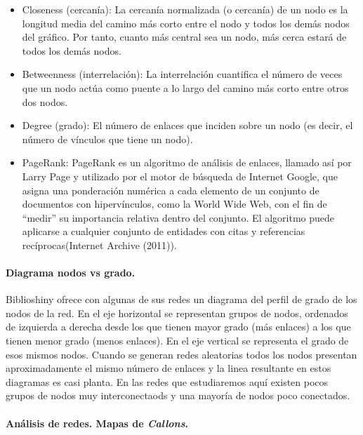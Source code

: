 \documentclass[
]{article}
\begin{document}
\begin{itemize}
\item
  Closeness (cercanía): La cercanía normalizada (o cercanía) de un nodo
  es la longitud media del camino más corto entre el nodo y todos los
  demás nodos del gráfico. Por tanto, cuanto más central sea un nodo,
  más cerca estará de todos los demás nodos.
\item
  Betweenness (interrelación): La interrelación cuantifica el número de
  veces que un nodo actúa como puente a lo largo del camino más corto
  entre otros dos nodos.
\item
  Degree (grado): El número de enlaces que inciden sobre un nodo (es
  decir, el número de vínculos que tiene un nodo).
\item
  PageRank: PageRank es un algoritmo de análisis de enlaces, llamado así
  por Larry Page y utilizado por el motor de búsqueda de Internet
  Google, que asigna una ponderación numérica a cada elemento de un
  conjunto de documentos con hipervínculos, como la World Wide Web, con
  el fin de ``medir'' su importancia relativa dentro del conjunto. El
  algoritmo puede aplicarse a cualquier conjunto de entidades con citas
  y referencias recíprocas(Internet Archive (2011)).
\end{itemize}

\hypertarget{diagrama-nodos-vs-grado.}{%
\paragraph{Diagrama nodos vs grado.}\label{diagrama-nodos-vs-grado.}}

Biblioshiny ofrece con algunas de sus redes un diagrama del perfil de
grado de los nodos de la red. En el eje horizontal se representan grupos
de nodos, ordenados de izquierda a derecha desde los que tienen mayor
grado (más enlaces) a los que tienen menor grado (menos enlaces). En el
eje vertical se representa el grado de esos mismos nodos. Cuando se
generan redes aleatorias todos los nodos presentan aproximadamente el
mismo número de enlaces y la linea resultante en estos diagramas es casi
planta. En las redes que estudiaremos aquí existen pocos grupos de nodos
muy interconectaods y una mayoría de nodos poco conectados.

\hypertarget{anuxe1lisis-de-redes.-mapas-de-callons.}{%
\paragraph{\texorpdfstring{Análisis de redes. Mapas de
\emph{Callons}.}{Análisis de redes. Mapas de Callons.}}\label{anuxe1lisis-de-redes.-mapas-de-callons.}}
\end{document}
